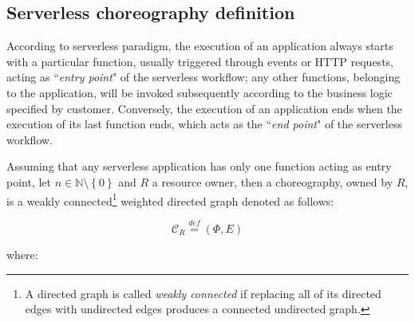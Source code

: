 \documentclass[12pt,a4paper]{report}
\newcommand{\mathDef}{\overset{\textit{def}}{=}}
\newcommand{\N}{\mathbb{N}}
\newcommand{\SetMinusZero}{\setminus \left\{0\right\}}
\begin{document}
\subsection{Serverless choreography definition}

According to serverless paradigm, the execution of an application always starts with a particular function, usually triggered through events or HTTP requests, acting as ``\textit{entry point}" of the serverless workflow; any other functions, belonging to the application, will be invoked subsequently according to the business logic specified by customer. Conversely, the execution of an application ends when the execution of its last function ends, which acts as the ``\textit{end point}" of the serverless workflow. 

Assuming that any serverless application has only one function acting as entry point, let $n \in \N \SetMinusZero$ and $R$ a resource owner, then a choreography, owned by $R$, is a weakly connected\footnote{A directed graph is called \textit{weakly connected} if replacing all of its directed edges with undirected edges produces a connected undirected graph.} weighted directed graph denoted as follows:

\begin{equation}
	\mathcal{C}_R \mathDef (\Phi,E)
\end{equation}

where:
\end{document}

